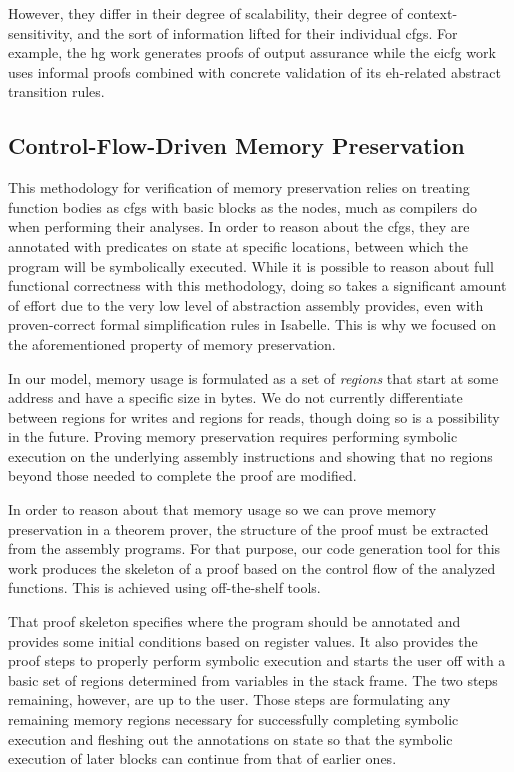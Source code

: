 However, they differ in their degree of scalability, their degree of context-sensitivity, and the sort of information lifted for their individual \acp{cfg}.
For example, the \ac{hg} work generates proofs of output assurance while the \ac{eicfg} work uses informal proofs combined with concrete validation of its \ac{eh}-related abstract transition rules.

\subsection{Control-Flow-Driven Memory Preservation}
This methodology for verification of memory preservation relies on treating function bodies as \acp{cfg} with basic blocks as the nodes, much as compilers do when performing their analyses.
In order to reason about the \acp{cfg}, they are annotated with predicates on state at specific locations, between which the program will be symbolically executed.
While it is possible to reason about full functional correctness with this methodology, doing so takes a significant amount of effort due to the very low level of abstraction assembly provides, even with proven-correct formal simplification rules in Isabelle.
This is why we focused on the aforementioned property of memory preservation.

In our model, memory usage is formulated as a set of \emph{regions} that start at some address and have a specific size in bytes.
We do not currently differentiate between regions for writes and regions for reads, though doing so is a possibility in the future.
Proving memory preservation requires performing symbolic execution on the underlying assembly instructions and showing that no regions beyond those needed to complete the proof are modified.

In order to reason about that memory usage so we can prove memory preservation in a theorem prover, the structure of the proof must be extracted from the assembly programs.
For that purpose, our code generation tool for this work produces the skeleton of a proof based on the control flow of the analyzed functions.
This is achieved using off-the-shelf tools.

That proof skeleton specifies where the program should be annotated and provides some initial conditions based on register values.
It also provides the proof steps to properly perform symbolic execution and starts the user off with a basic set of regions determined from variables in the stack frame.
The two steps remaining, however, are up to the user.
Those steps are formulating any remaining memory regions necessary for successfully completing symbolic execution and fleshing out the annotations on state so that the symbolic execution of later blocks can continue from that of earlier ones.

